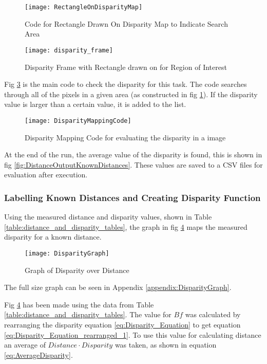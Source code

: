 \documentclass[conference]{IEEEtran}
\begin{document}
\begin{figure}[H]
\centerline{\texttt{[image: RectangleOnDisparityMap]}}
\caption{Code for Rectangle Drawn On Disparity Map to Indicate Search Area}
\label{fig:RectangleOnDisparityMap}
\end{figure}

\begin{figure}[H]
\centerline{\texttt{[image: disparity\_frame]}}
\caption{Disparity Frame with Rectangle drawn on for Region of Interest}
\label{fig:disparity_frame}
\end{figure}

Fig \ref{fig:DisparityMappingCode} is the main code to check the disparity for this task. The code searches through all of the pixels in a given area (as constructed in fig \ref{fig:RectangleOnDisparityMap}). If the disparity value is larger than a certain value, it is added to the list. 

\begin{figure}[H]
\centerline{\texttt{[image: DisparityMappingCode]}}
\caption{Disparity Mapping Code for evaluating the disparity in a image}
\label{fig:DisparityMappingCode}
\end{figure}

At the end of the run, the average value of the disparity is found, this is shown in fig \ref{fig:DistanceOutputKnownDistances}. These values are saved to a CSV files for evaluation after execution. 

\subsubsection{Labelling Known Distances and Creating Disparity Function}

Using the measured distance and disparity values, shown in Table \ref{table:distance_and_disparity_tables}, the graph in fig \ref{fig:DisparityGraph} maps the measured disparity for a known distance.

\begin{figure}[H]
\centerline{\texttt{[image: DisparityGraph]}}
\caption{Graph of Disparity over Distance }
\label{fig:DisparityGraph}
\end{figure} 

The full size graph can be seen in Appendix \ref{appendix:DisparityGraph}.

Fig \ref{fig:DisparityGraph} has been made using the data from Table \ref{table:distance_and_disparity_tables}. The value for $Bf$ was calculated by rearranging the disparity equation \ref{eq:Disparity_Equation} to get equation \ref{eq:Disparity_Equation_rearranged_1}. To use this value for calculating distance an average of $Distance \cdot Disparity$ was taken, as shown in equation \ref{eq:AverageDisparity}. 
\end{document}
